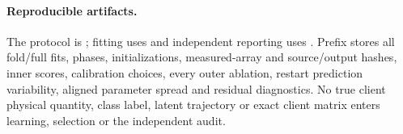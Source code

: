 \paragraph{Reproducible artifacts.}
\begin{sloppypar}
The protocol is ; fitting uses
 and independent
reporting uses . Prefix
 stores all fold/full fits, phases,
initializations, measured-array and source/output hashes, inner scores,
calibration choices, every outer ablation, restart prediction variability,
aligned parameter spread and residual diagnostics. No true client physical
quantity, class label, latent trajectory or exact client matrix enters
learning, selection or the independent audit.
\end{sloppypar}
